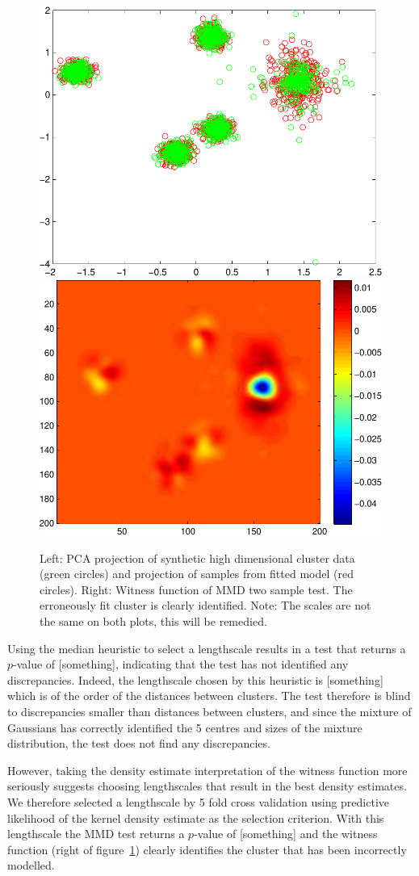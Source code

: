 \documentclass{article} %
\begin{document}
\begin{figure}[ht]
\centering
\includegraphics[width=0.4\columnwidth]{figures/high_mog_fa}
\hspace{0.1\columnwidth}
\includegraphics[width=0.4\columnwidth]{figures/high_mog_witness}
\caption{
Left: PCA projection of synthetic high dimensional cluster data (green circles) and projection of samples from fitted model (red circles).
Right: Witness function of MMD two sample test. The erroneously fit cluster is clearly identified.
Note: The scales are not the same on both plots, this will be remedied.
}
\label{fig:high_mog}
\end{figure}

Using the median heuristic to select a lengthscale results in a test that returns a $p$-value of [something], indicating that the test has not identified any discrepancies.
Indeed, the lengthscale chosen by this heuristic is [something] which is of the order of the distances between clusters.
The test therefore is blind to discrepancies smaller than distances between clusters, and since the mixture of Gaussians has correctly identified the 5 centres and sizes of the mixture distribution, the test does not find any discrepancies.

However, taking the density estimate interpretation of the witness function more seriously suggests choosing lengthscales that result in the best density estimates.
We therefore selected a lengthscale by 5 fold cross validation using predictive likelihood of the kernel density estimate as the selection criterion.
With this lengthscale the MMD test returns a $p$-value of [something] and the witness function (right of figure~\ref{fig:high_mog}) clearly identifies the cluster that has been incorrectly modelled.
\end{document}

